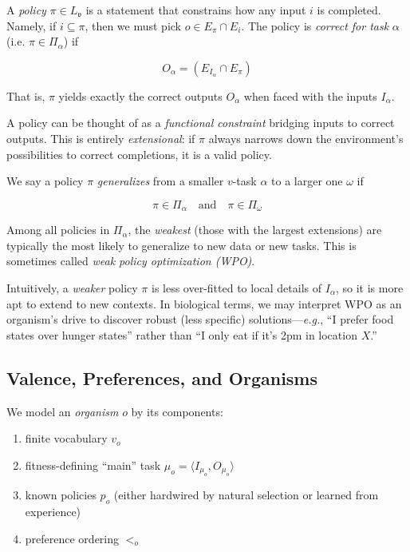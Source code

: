 \documentclass[12pt,letterpaper]{article}
\begin{document}
\begin{definition}
A \textit{policy} $\pi \in L_{\mathfrak{v}}$ is a statement that constrains how any input $i$ is completed. Namely, if $i \subseteq \pi$, then we must pick $o \in E_{\pi} \cap E_i$.
The policy is \textit{correct for task} $\alpha$ (i.e. $\pi \in \Pi_\alpha$) if

\[
   O_\alpha = (E_{I_\alpha} \cap E_\pi)
\]

That is, $\pi$ yields exactly the correct outputs $O_\alpha$ when faced with the inputs $I_\alpha$.
\end{definition}

A policy can be thought of as a \textit{functional constraint} bridging inputs to correct outputs. This is entirely \textit{extensional}: if $\pi$ always narrows down the environment's possibilities to correct completions, it is a valid policy.

\begin{definition}
We say a policy $\pi$ \textit{generalizes} from a smaller $v$-task $\alpha$ to a larger one $\omega$ if

\[
   \pi \in \Pi_\alpha \quad\text{and}\quad \pi \in \Pi_\omega
\]

Among all policies in $\Pi_\alpha$, the \textit{weakest} (those with the largest extensions) are typically the most likely to generalize to new data or new tasks. This is sometimes called \textit{weak policy optimization (WPO)}.
\end{definition}

Intuitively, a \textit{weaker} policy $\pi$ is less over-fitted to local details of $I_\alpha$, so it is more apt to extend to new contexts. In biological terms, we may interpret WPO as an organism's drive to discover robust (less specific) solutions---\textit{e.g.}, ``I prefer food states over hunger states'' rather than ``I only eat if it's 2pm in location $X$.''

\subsection{Valence, Preferences, and Organisms}

We model an \textit{organism} $o$ by its components:
\begin{enumerate}
\item finite vocabulary $v_o$
\item fitness-defining ``main'' task $\mu_o = \langle I_{\mu_o}, O_{\mu_o} \rangle$
\item known policies $p_o$ (either hardwired by natural selection or learned from experience)
\item preference ordering $<_o$
\end{enumerate}
\end{document}

